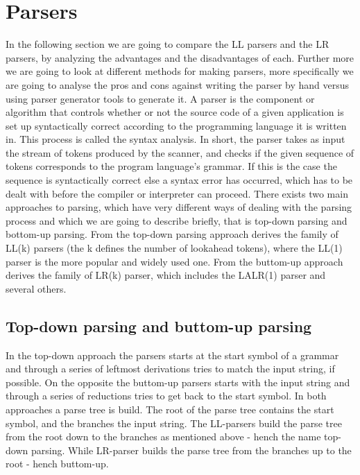 \section{Parsers}
\label{sec:parsers}

In the following section we are going to compare the LL parsers and the LR parsers, by analyzing the advantages and the disadvantages of each. Further more we are going to look at different methods for making parsers, more specifically we are going to analyse the pros and cons against writing the parser by hand versus using parser generator tools to generate it. A parser is the component or algorithm that controls whether or not the source code of a given application is set up syntactically correct according to the programming language it is written in. This process is called the syntax analysis. In short, the parser takes as input the stream of tokens produced by the scanner, and checks if the given sequence of tokens corresponds to the program language's grammar. If this is the case the sequence is syntactically correct else a syntax error has occurred, which has to be dealt with before the compiler or interpreter can proceed. There exists two main approaches to parsing, which have very different ways of dealing with the parsing process and which we are going to describe briefly, that is top-down parsing and bottom-up parsing. From the top-down parsing approach derives the family of LL(k) parsers (the k defines the number of lookahead tokens), where the LL(1) parser is the more popular and widely used one. From the buttom-up approach derives the family of LR(k) parser, which includes the LALR(1) parser and several others.

\subsection{Top-down parsing and buttom-up parsing}

In the top-down approach the parsers starts at the start symbol of a grammar and through a series of leftmost derivations tries to match the input string, if possible. On the opposite the buttom-up parsers starts with the input string and through a series of reductions tries to get back to the start symbol. In both approaches a parse tree is build. The root of the parse tree contains the start symbol, and the branches the input string. The LL-parsers
build the parse tree from the root down to the branches as mentioned above - hench the name top-down parsing. While LR-parser builds the parse tree from the branches up to the root - hench buttom-up.


